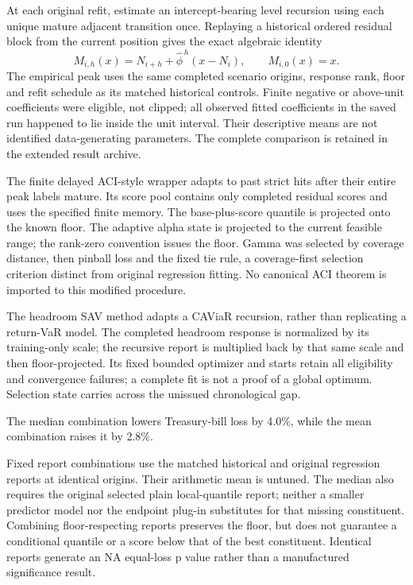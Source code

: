 \documentclass[10pt,a4paper]{article}
\begin{document}
At each original refit, estimate an intercept-bearing level recursion
using each unique mature adjacent transition once. Replaying a historical ordered
residual block from the current position gives the exact algebraic identity
\[
M_{i,h}(x)=N_{i+h}+\widehat\phi^{\,h}(x-N_i),\qquad M_{i,0}(x)=x.
\]
The empirical peak uses the same completed scenario origins, response rank,
floor and refit schedule as its matched historical controls. Finite negative or
above-unit coefficients were eligible, not clipped; all observed fitted
coefficients in the saved run happened to lie inside the unit interval.
Their descriptive means are not identified data-generating parameters.
The complete comparison is retained in the extended result archive.

The finite delayed ACI-style wrapper adapts to past strict hits after their entire peak labels mature. Its score pool contains only completed residual
scores and uses the specified finite memory. The base-plus-score quantile is
projected onto the known floor. The adaptive alpha state is projected to the
current feasible range; the rank-zero convention issues the floor. Gamma was
selected by coverage distance, then pinball loss and the fixed tie rule, a
coverage-first selection criterion distinct from original regression fitting.
No canonical ACI theorem is imported to this modified procedure.

The headroom SAV method adapts a CAViaR recursion, rather than replicating a
return-VaR model. The completed headroom response is normalized by its
training-only scale; the recursive report is multiplied back by that same
scale and then floor-projected. Its fixed bounded optimizer and starts retain
all eligibility and convergence failures; a complete fit is not a proof of a
global optimum. Selection state carries across the unissued chronological gap.

The median combination lowers Treasury-bill loss by 4.0\%, while the mean combination raises it by 2.8\%.

Fixed report combinations use the matched historical and original
regression reports at identical origins. Their arithmetic mean is untuned.
The median also requires the original selected plain local-quantile report;
neither a smaller predictor model nor the endpoint plug-in substitutes for
that missing constituent. Combining floor-respecting reports preserves the floor, but does not guarantee a conditional quantile or a score below that of the best constituent. Identical reports generate an NA equal-loss p value rather
than a manufactured significance result.
\end{document}
